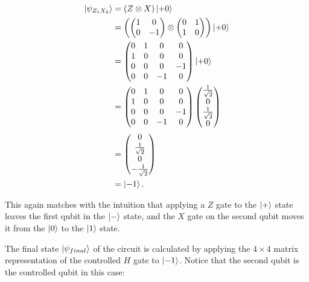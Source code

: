 \begin{align}
  \Ket{\psi_{Z_1X_2}}  &= (Z \otimes X) \Ket{+0} \\
                    &= \left(\begin{pmatrix} 1 & 0 \\ 0 & -1 \end{pmatrix} \otimes \begin{pmatrix} 0 & 1 \\ 1 & 0 \end{pmatrix}\right) \Ket{+0} \\
                    &= \begin{pmatrix} 0 & 1 & 0 & 0 \\ 1 & 0 & 0 & 0 \\ 0 & 0 & 0 & -1 \\ 0 & 0 & -1 & 0 \end{pmatrix} \Ket{+0} \\
                    &= \begin{pmatrix} 0 & 1 & 0 & 0 \\ 1 & 0 & 0 & 0 \\ 0 & 0 & 0 & -1 \\ 0 & 0 & -1 & 0 \end{pmatrix} \begin{pmatrix} \frac{1}{\sqrt{2}} \\ 0 \\ \frac{1}{\sqrt{2}} \\ 0 \end{pmatrix} \\
                    &= \begin{pmatrix} 0 \\ \frac{1}{\sqrt{2}} \\ 0 \\ -\frac{1}{\sqrt{2}} \end{pmatrix} \\
                    &= \Ket{-1}.
\end{align}

This again matches with the intuition that applying a $Z$ gate to the $\Ket{+}$
state leaves the first qubit in the $\Ket{-}$ state, and the $X$ gate on the second qubit moves it from the $\Ket{0}$ to the $\Ket{1}$ state.

The final state $\Ket{\psi_{final}}$ of the circuit is calculated by applying the $4 \times 4$ matrix
representation of the controlled $H$ gate to $\Ket{-1}$. Notice that the second
qubit is the controlled qubit in this case:

